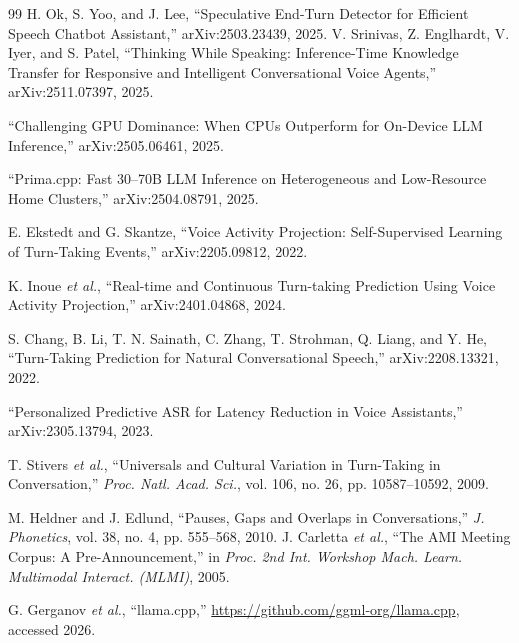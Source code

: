 \documentclass[journal]{IEEEtran}
\begin{document}
\begin{thebibliography}{99}
 H. Ok, S. Yoo, and J. Lee, ``Speculative End-Turn Detector for Efficient Speech Chatbot Assistant,'' arXiv:2503.23439, 2025.
 V. Srinivas, Z. Englhardt, V. Iyer, and S. Patel, ``Thinking While Speaking: Inference-Time Knowledge Transfer for Responsive and Intelligent Conversational Voice Agents,'' arXiv:2511.07397, 2025.

 ``Challenging GPU Dominance: When CPUs Outperform for On-Device LLM Inference,'' arXiv:2505.06461, 2025.

 ``Prima.cpp: Fast 30--70B LLM Inference on Heterogeneous and Low-Resource Home Clusters,'' arXiv:2504.08791, 2025.

 E. Ekstedt and G. Skantze, ``Voice Activity Projection: Self-Supervised Learning of Turn-Taking Events,'' arXiv:2205.09812, 2022.

 K. Inoue \emph{et al.}, ``Real-time and Continuous Turn-taking Prediction Using Voice Activity Projection,'' arXiv:2401.04868, 2024.

 S. Chang, B. Li, T. N. Sainath, C. Zhang, T. Strohman, Q. Liang, and Y. He, ``Turn-Taking Prediction for Natural Conversational Speech,'' arXiv:2208.13321, 2022.

 ``Personalized Predictive ASR for Latency Reduction in Voice Assistants,'' arXiv:2305.13794, 2023.

 T. Stivers \emph{et al.}, ``Universals and Cultural Variation in Turn-Taking in Conversation,'' \emph{Proc. Natl. Acad. Sci.}, vol. 106, no. 26, pp. 10587--10592, 2009.

 M. Heldner and J. Edlund, ``Pauses, Gaps and Overlaps in Conversations,'' \emph{J. Phonetics}, vol. 38, no. 4, pp. 555--568, 2010.
 J. Carletta \emph{et al.}, ``The AMI Meeting Corpus: A Pre-Announcement,'' in \emph{Proc. 2nd Int. Workshop Mach. Learn. Multimodal Interact. (MLMI)}, 2005.

 G. Gerganov \emph{et al.}, ``llama.cpp,'' \url{https://github.com/ggml-org/llama.cpp}, accessed 2026.

\end{thebibliography}
\end{document}
